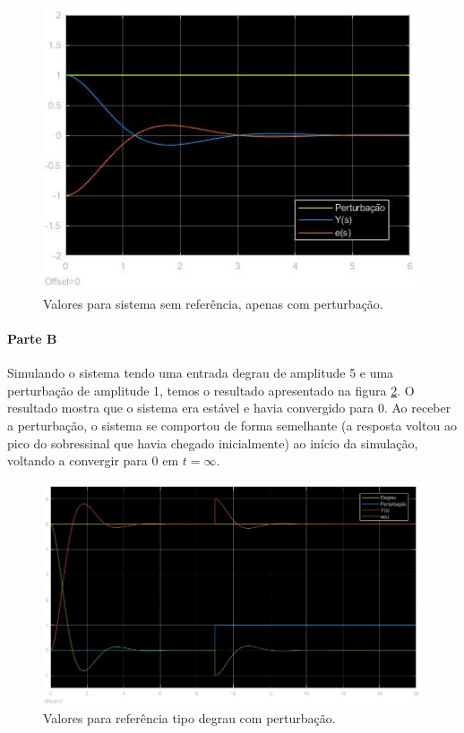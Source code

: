 \documentclass[
]{book}
\theoremstyle{definition}
\theoremstyle{definition}
\theoremstyle{definition}
\theoremstyle{remark}
\begin{document}
\begin{figure}
\includegraphics[width=0.8\linewidth]{Imagens/Lab4/Resolução/prob3A1} \caption{Valores para sistema sem referência, apenas com perturbação.}\label{fig:fig43A1}
\end{figure}

\hypertarget{parte-b-3}{%
\paragraph{Parte B}\label{parte-b-3}}

Simulando o sistema tendo uma entrada degrau de amplitude 5 e uma perturbação de amplitude 1, temos o resultado apresentado na figura \ref{fig:fig43B1}. O resultado mostra que o sistema era estável e havia convergido para 0. Ao receber a perturbação, o sistema se comportou de forma semelhante (a resposta voltou ao pico do sobressinal que havia chegado inicialmente) ao início da simulação, voltando a convergir para 0 em \(t=\infty\).

\begin{figure}
\includegraphics[width=0.8\linewidth]{Imagens/Lab4/Resolução/prob3B1} \caption{Valores para referência tipo degrau com perturbação.}\label{fig:fig43B1}
\end{figure}
\end{document}
